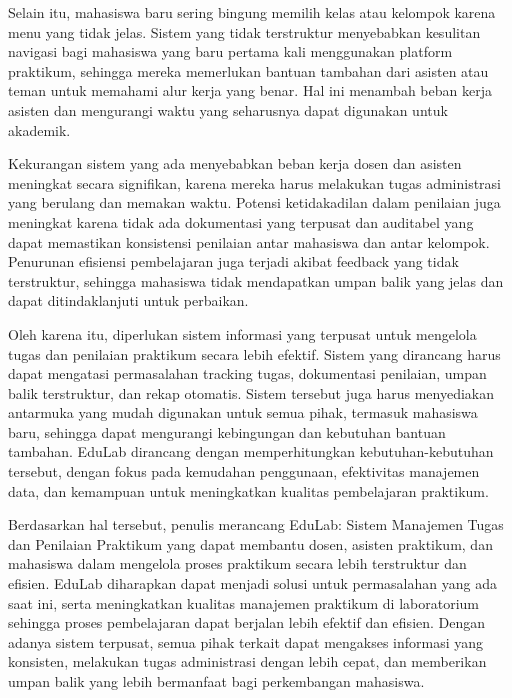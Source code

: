 \documentclass[12pt,a4paper,twoside]{report}
\begin{document}
Selain itu, mahasiswa baru sering bingung memilih kelas atau kelompok karena menu yang tidak jelas. Sistem yang tidak terstruktur menyebabkan kesulitan navigasi bagi mahasiswa yang baru pertama kali menggunakan platform praktikum, sehingga mereka memerlukan bantuan tambahan dari asisten atau teman untuk memahami alur kerja yang benar. Hal ini menambah beban kerja asisten dan mengurangi waktu yang seharusnya dapat digunakan untuk akademik.

Kekurangan sistem yang ada menyebabkan beban kerja dosen dan asisten meningkat secara signifikan, karena mereka harus melakukan tugas administrasi yang berulang dan memakan waktu. Potensi ketidakadilan dalam penilaian juga meningkat karena tidak ada dokumentasi yang terpusat dan auditabel yang dapat memastikan konsistensi penilaian antar mahasiswa dan antar kelompok. Penurunan efisiensi pembelajaran juga terjadi akibat feedback yang tidak terstruktur, sehingga mahasiswa tidak mendapatkan umpan balik yang jelas dan dapat ditindaklanjuti untuk perbaikan.

Oleh karena itu, diperlukan sistem informasi yang terpusat untuk mengelola tugas dan penilaian praktikum secara lebih efektif. Sistem yang dirancang harus dapat mengatasi permasalahan tracking tugas, dokumentasi penilaian, umpan balik terstruktur, dan rekap otomatis. Sistem tersebut juga harus menyediakan antarmuka yang mudah digunakan untuk semua pihak, termasuk mahasiswa baru, sehingga dapat mengurangi kebingungan dan kebutuhan bantuan tambahan. EduLab dirancang dengan memperhitungkan kebutuhan-kebutuhan tersebut, dengan fokus pada kemudahan penggunaan, efektivitas manajemen data, dan kemampuan untuk meningkatkan kualitas pembelajaran praktikum.

Berdasarkan hal tersebut, penulis merancang EduLab: Sistem Manajemen Tugas dan Penilaian Praktikum yang dapat membantu dosen, asisten praktikum, dan mahasiswa dalam mengelola proses praktikum secara lebih terstruktur dan efisien. EduLab diharapkan dapat menjadi solusi untuk permasalahan yang ada saat ini, serta meningkatkan kualitas manajemen praktikum di laboratorium sehingga proses pembelajaran dapat berjalan lebih efektif dan efisien. Dengan adanya sistem terpusat, semua pihak terkait dapat mengakses informasi yang konsisten, melakukan tugas administrasi dengan lebih cepat, dan memberikan umpan balik yang lebih bermanfaat bagi perkembangan mahasiswa.
\end{document}
